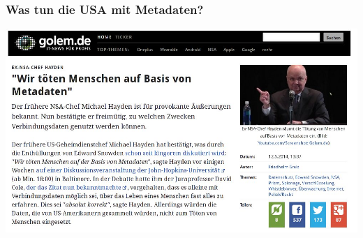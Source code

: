 \documentclass[12pt]{beamer}
\begin{document}
\begin{frame}
  \frametitle{Was tun die USA mit Metadaten?}
  \pause
  \begin{center}
    \includegraphics[height=0.7\textheight]{img/wekillpeople.jpg}
  \end{center}
\end{frame}
\end{document}
